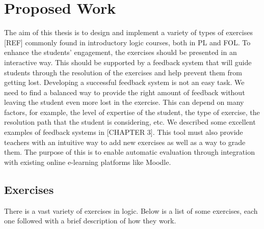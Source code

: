
%

\chapter{Proposed Work}
The aim of this thesis is to design and implement a variety of types of exercises [REF] commonly found in introductory logic courses, both in PL and FOL. To enhance the students' engagement, the exercises should be presented in an interactive way. This should be supported by a feedback system that will guide students through the resolution of the exercises and help prevent them from getting lost. Developing a successful feedback system is not an easy task. We need to find a balanced way to provide the right amount of feedback without leaving the student even more lost in the exercise. This can depend on many factors, for example, the level of expertise of the student, the type of exercise, the resolution path that the student is considering, etc. We described some excellent examples of feedback systems in [CHAPTER 3]. This tool must also provide teachers with an intuitive way to add new exercises as well as a way to grade them. The purpose of this is to enable automatic evaluation through integration with existing online e-learning platforms like Moodle.

\section{Exercises}

There is a vast variety of exercises in logic. Below is a list of some exercises, each one followed with a brief description of how they work. %

